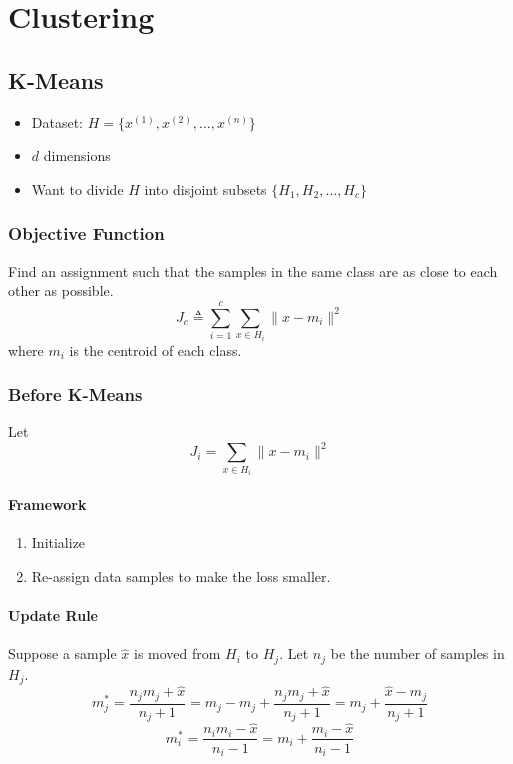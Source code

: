 \chapter{Clustering}
\newpage


\section{K-Means}
\begin{itemize}
    \item Dataset: $H=\{x^{(1)},x^{(2)},\dots,x^{(n)}\}$
    \item $d$ dimensions
    \item Want to divide $H$ into disjoint subsets $\{H_1,H_2,\dots,H_c\}$
\end{itemize}

\subsection{Objective Function}
Find an assignment such that the samples in the same class are as close to each other as possible.
\[ J_c \triangleq \sum_{i=1}^c\sum_{x\in H_i} \|x-m_i\|^2 \]
where $m_i$ is the centroid of each class.

\subsection{Before K-Means}
Let
\[ J_i = \sum_{x\in H_i}\|x-m_i\|^2 \]

\subsubsection{Framework}
\begin{enumerate}
    \item Initialize
    \item Re-assign data samples to make the loss smaller.
\end{enumerate}

\subsubsection{Update Rule}
Suppose a sample $\hat{x}$ is moved from $H_i$ to $H_j$. Let $n_j$ be the number of samples in $H_j$.
\[ m^*_j = \frac{n_jm_j + \hat{x}}{n_j+1} = m_j - m_j + \frac{n_jm_j + \hat{x}}{n_j+1} = m_j + \frac{\hat{x}-m_j}{n_j+1} \]
\[ m^*_i = \frac{n_im_i - \hat{x}}{n_i-1} = m_i + \frac{m_i - \hat{x}}{n_i-1} \]

